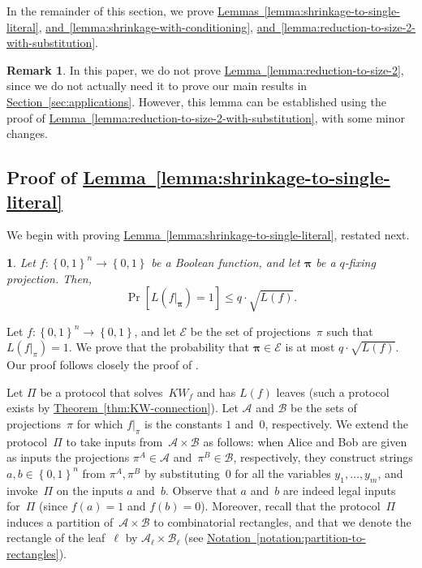 \documentclass[11pt]{article}
\makeatletter
\numberwithin{equation}{section}
\theoremstyle{definition}
\newtheorem{remark}[theorem]{Remark}
\theoremstyle{plain}
\newcommand{\expref}[2]{\hyperref[#2]{#1~\ref{#2}}}
\theoremstyle{definition}\newtheorem{notation}[theorem]{Notation}\theoremstyle{plain}
\newcommand{\B}{\left\{ 0,1 \right \}}
\newcommand{\cA}{\mathcal{A}}
\newcommand{\cB}{\mathcal{B}}
\newcommand{\KW}{\mathit{KW}}
\newcommand{\p}{\boldsymbol{\pi}}
\newcommand{\cE}{\mathcal{E}}
\theoremstyle{definition}
\theoremstyle{plain}
\newtheorem*{restated@theorem}{\rep@title}
\newenvironment{restated}[1]{%
	 \def\rep@title{#1}%
	 \begin{restated@theorem}}%
	{\end{restated@theorem}}
\makeatother
\begin{document}
\noindent In the remainder of this section, we prove
\expref{Lemmas}{lemma:shrinkage-to-single-literal},
\expref{and}{lemma:shrinkage-with-conditioning},
\expref{and}{lemma:reduction-to-size-2-with-substitution}.
\begin{remark}
In this paper, we do not prove \expref{Lemma}{lemma:reduction-to-size-2}, since we
%
do not actually need it to prove our main results in \expref{Section}{sec:applications}.
%
However, this lemma can be
established using the proof of \expref{Lemma}{lemma:reduction-to-size-2-with-substitution},
with some minor changes. 
\end{remark}


\subsection{\label{subsec:shrinkage-to-single-literal}Proof of \expref{Lemma}{lemma:shrinkage-to-single-literal}}

We begin with proving \expref{Lemma}{lemma:shrinkage-to-single-literal}, restated
next.
\begin{restated}{\expref{Lemma}{lemma:shrinkage-to-single-literal}}
Let $f\colon\B^{n}\to\B$ be a Boolean function, and let $\p$ be
a $q$-fixing projection. Then, 
\[
\Pr\!\left[L(f|_{\p})=1\right]\le q\cdot\sqrt{L(f)}.
\]
\end{restated}

Let $f\colon\B^{n}\to\B$, and let $\cE$ be the set of projections~$\pi$
such that $L(f|_{\pi})=1$. We prove that the probability that $\p\in\cE$
is at most $q\cdot\sqrt{L(f)}$. Our proof follows closely the proof
of \cite[Lemma 4.1]{H98}.

Let $\Pi$ be a protocol that solves~$\KW_{f}$ and has $L(f)$ leaves
(such a protocol exists by \expref{Theorem}{thm:KW-connection}).
Let $\cA$ and $\cB$
be the sets of projections~$\pi$ for which $f|_{\pi}$ is the constants
$1$ and~$0$, respectively. We extend the protocol~$\Pi$ to take
inputs from~$\cA\times\cB$ as follows: when Alice and Bob are given
as inputs the projections $\pi^{A}\in\cA$ and~$\pi^{B}\in\cB$,
respectively, they construct strings $a,b\in\B^{n}$ from $\pi^{A},\pi^{B}$
by substituting~$0$ for all the variables $y_{1},\ldots,y_{m}$,
and invoke~$\Pi$ on the inputs $a$ and~$b$. Observe that $a$
and~$b$ are indeed legal inputs for~$\Pi$ (since $f(a)=1$ and
$f(b)=0$). Moreover, recall that the protocol~$\Pi$ induces a partition
of~$\cA\times\cB$ to combinatorial rectangles, and that we denote
the rectangle of the leaf~$\ell$ by $\cA_{\ell}\times\cB_{\ell}$
(see \expref{Notation}{notation:partition-to-rectangles}).
\end{document}
